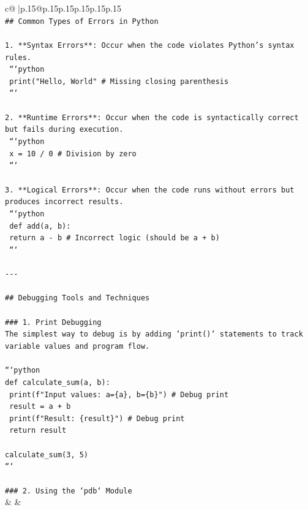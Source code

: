 \documentclass{article}
\begin{document}
{\begin{supertabular}{c@{$\;$}|p{.15\linewidth}@{}p{.15\linewidth}p{.15\linewidth}p{.15\linewidth}p{.15\linewidth}p{.15\linewidth}}
{{{\\ 
\texttt{\#\# Common Types of Errors in Python} \\
\\ 
\texttt{1. **Syntax Errors**: Occur when the code violates Python's syntax rules.} \\
\texttt{   ```python} \\
\texttt{   print("Hello, World"  \# Missing closing parenthesis} \\
\texttt{   ```} \\
\\ 
\texttt{2. **Runtime Errors**: Occur when the code is syntactically correct but fails during execution.} \\
\texttt{   ```python} \\
\texttt{   x = 10 / 0  \# Division by zero} \\
\texttt{   ```} \\
\\ 
\texttt{3. **Logical Errors**: Occur when the code runs without errors but produces incorrect results.} \\
\texttt{   ```python} \\
\texttt{   def add(a, b):} \\
\texttt{       return a {-} b  \# Incorrect logic (should be a + b)} \\
\texttt{   ```} \\
\\ 
\texttt{{-}{-}{-}} \\
\\ 
\texttt{\#\# Debugging Tools and Techniques} \\
\\ 
\texttt{\#\#\# 1. Print Debugging} \\
\texttt{The simplest way to debug is by adding `print()` statements to track variable values and program flow.} \\
\\ 
\texttt{```python} \\
\texttt{def calculate\_sum(a, b):} \\
\texttt{    print(f"Input values: a=\{a\}, b=\{b\}")  \# Debug print} \\
\texttt{    result = a + b} \\
\texttt{    print(f"Result: \{result\}")  \# Debug print} \\
\texttt{    return result} \\
\\ 
\texttt{calculate\_sum(3, 5)} \\
\texttt{```} \\
\\ 
\texttt{\#\#\# 2. Using the `pdb` Module} \\
            }
        }
    }
    & & \\ \\


\end{supertabular}}
\end{document}
